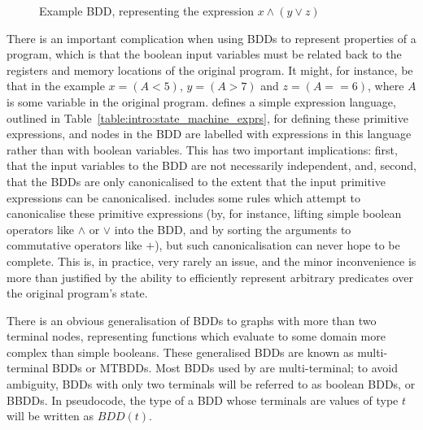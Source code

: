 
\begin{figure}
  \caption{Example BDD, representing the expression $x \wedge (y \vee z)$}
  \label{fig:intro:example_bdd}
\end{figure}

There is an important complication when using BDDs to represent
properties of a program, which is that the boolean input variables
must be related back to the registers and memory locations of the
original program.  It might, for instance, be that in the example $x =
(A < 5)$, $y = (A > 7)$ and $z = (A == 6)$, where $A$ is some variable
in the original program.  {\Technique} defines a simple expression
language, outlined in Table~\ref{table:intro:state_machine_exprs}, for
defining these primitive expressions, and nodes in the BDD are
labelled with expressions in this language rather than with boolean
variables.  This has two important implications: first, that the input
variables to the BDD are not necessarily independent, and, second,
that the BDDs are only canonicalised to the extent that the input
primitive expressions can be canonicalised.  {\Implementation}
includes some rules which attempt to canonicalise these primitive
expressions (by, for instance, lifting simple boolean operators like
$\wedge$ or $\vee$ into the BDD, and by sorting the arguments to
commutative operators like $+$), but such canonicalisation can never
hope to be complete.  This is,
in practice, very rarely an issue, and the minor inconvenience is more
than justified by the ability to efficiently represent arbitrary
predicates over the original program's state.

There is an obvious generalisation of BDDs to graphs with more than
two terminal nodes, representing functions which evaluate to some
domain more complex than simple booleans.  These generalised BDDs are
known as multi-terminal BDDs or MTBDDs\needCite{}.  Most BDDs used by
{\Technique} are multi-terminal; to avoid ambiguity, BDDs with only
two terminals will be referred to as boolean BDDs, or BBDDs.  In
pseudocode, the type of a BDD whose terminals are values of type $t$
will be written as $BDD(t)$.

